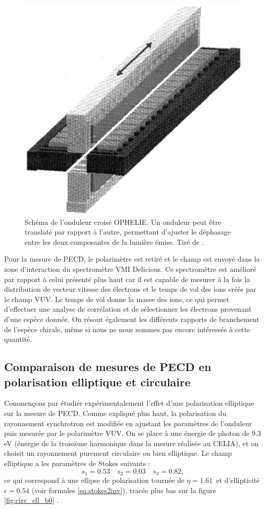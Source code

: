 \begin{figure}[!ht]
\centering
\includegraphics[width=0.4\columnwidth]{Figures/Soleil/onduleur.jpg}%
\caption{Schéma de l'onduleur croisé OPHELIE. Un onduleur peut être translaté par rapport à l'autre, permettant d'ajuster le déphasage entre les deux composantes de la lumière émise. Tiré de .}
\label{fig:onduleur}
\end{figure}

Pour la mesure de PECD, le polarimètre est retiré et le champ est envoyé dans la zone d'interaction du spectromètre VMI Delicious. Ce spectromètre est amélioré par rapport à celui présenté plus haut car il est capable de mesurer à la fois la distribution de vecteur vitesse des électrons et le temps de vol des ions créés par le champ VUV. Le temps de vol donne la masse des ions, ce qui permet d'effectuer une analyse de corrélation et de sélectionner les électrons provenant d'une espèce donnée. On résout également les différents rapports de branchement de l'espèce chirale, même si nous ne nous sommes pas encore intéressés à cette quantité.

\subsection{Comparaison de mesures de PECD en polarisation elliptique et circulaire}
Commençons par étudier expérimentalement l'effet d'une polarisation elliptique sur la mesure de PECD. Comme expliqué plus haut, la polarisation du rayonnement synchrotron est modifiée en ajustant les paramètres de l'onduleur puis mesurée par le polarimètre VUV. On se place à une énergie de photon de 9.3 eV (énergie de la troisième harmonique dans la mesure réalisée au CELIA), et on choisit un rayonnement purement circulaire ou bien elliptique. Le champ elliptique a les paramètres de Stokes suivants :
\[ s_1=0.53\quad s_2=0.03\quad s_3=0.82, \]
ce qui correspond à une ellipse de polarisation tournée de $\eta=1.61$\degres~et d'ellipticité $\epsilon = 0.54$ (voir formules \ref{eq:stokes2inv}), tracée plus bas sur la figure \ref{fig:circ_ell_b0} .
 
